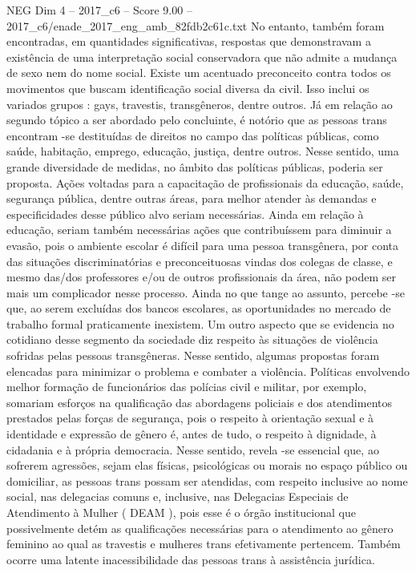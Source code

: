 \begin{textsample}{NEG Dim 4 – 2017\_c6 – Score 9.00 – 2017\_c6/enade\_2017\_eng\_amb\_82fdb2c61c.txt}
No entanto, também foram encontradas, em quantidades significativas, respostas que demonstravam a existência de uma interpretação social conservadora que não admite a mudança de sexo nem do nome social.
Existe um acentuado preconceito contra todos os movimentos que buscam identificação social diversa da civil.
Isso inclui os variados grupos : gays, travestis, transgêneros, dentre outros.
Já em relação ao segundo tópico a ser abordado pelo concluinte, é notório que as pessoas trans encontram -se destituídas de direitos no campo das políticas públicas, como saúde, habitação, emprego, educação, justiça, dentre outros.
Nesse sentido, uma grande diversidade de medidas, no âmbito das políticas públicas, poderia ser proposta.
Ações voltadas para a capacitação de profissionais da educação, saúde, segurança pública, dentre outras áreas, para melhor atender às demandas e especificidades desse público alvo seriam necessárias.
Ainda em relação à educação, seriam também necessárias ações que contribuíssem para diminuir a evasão, pois o ambiente escolar é difícil para uma pessoa transgênera, por conta das situações discriminatórias e preconceituosas vindas dos colegas de classe, e mesmo das/dos professores e/ou de outros profissionais da área, não podem ser mais um complicador nesse processo.
Ainda no que tange ao assunto, percebe -se que, ao serem excluídas dos bancos escolares, as oportunidades no mercado de trabalho formal praticamente inexistem.
Um outro aspecto que se evidencia no cotidiano desse segmento da sociedade diz respeito às situações de violência sofridas pelas pessoas transgêneras.
Nesse sentido, algumas propostas foram elencadas para minimizar o problema e combater a violência.
Políticas envolvendo melhor formação de funcionários das polícias civil e militar, por exemplo, somariam esforços na qualificação das abordagens policiais e dos atendimentos prestados pelas forças de segurança, pois o respeito à orientação sexual e à identidade e expressão de gênero é, antes de tudo, o respeito à dignidade, à cidadania e à própria democracia.
Nesse sentido, revela -se essencial que, ao sofrerem agressões, sejam elas físicas, psicológicas ou morais no espaço público ou domiciliar, as pessoas trans possam ser atendidas, com respeito inclusive ao nome social, nas delegacias comuns e, inclusive, nas Delegacias Especiais de Atendimento à Mulher ( DEAM ), pois esse é o órgão institucional que possivelmente detém as qualificações necessárias para o atendimento ao gênero feminino ao qual as travestis e mulheres trans efetivamente pertencem.
Também ocorre uma latente inacessibilidade das pessoas trans à assistência jurídica.

\end{textsample}
